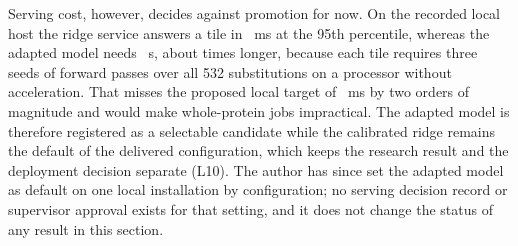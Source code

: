 Serving cost, however, decides against promotion for now. On the recorded local host the ridge
service answers a tile in \nTLatRidge{}~ms at the 95th percentile, whereas the adapted model needs
\nTLatLora{}~s, about \nTLatRatio{} times longer, because each tile requires three seeds of forward
passes over all 532 substitutions on a processor without acceleration. That misses the proposed
local target of \nTLatTarget{}~ms by two orders of magnitude and would make whole-protein jobs
impractical. The adapted model is therefore registered as a selectable candidate while the
calibrated ridge remains the default of the delivered configuration, which keeps the research result
and the deployment decision separate (L10). The author has since set the adapted model as default
on one local installation by configuration; no serving decision record or supervisor approval exists
for that setting, and it does not change the status of any result in this section.
